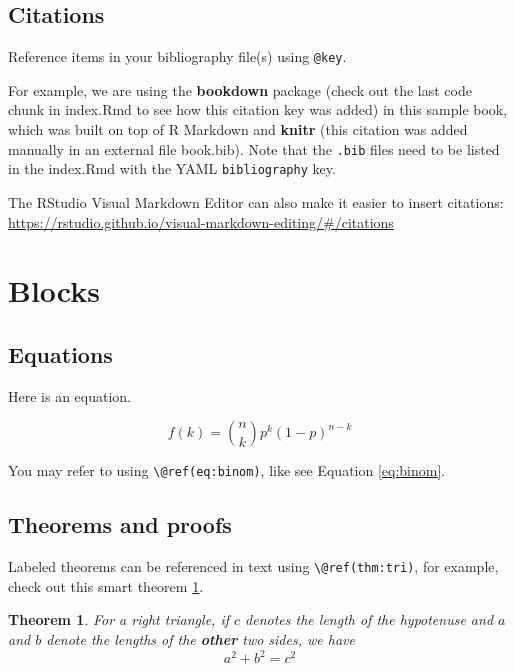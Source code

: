\documentclass[
]{book}
\newtheorem{theorem}{Theorem}[chapter]
\theoremstyle{definition}
\theoremstyle{definition}
\theoremstyle{definition}
\theoremstyle{definition}
\theoremstyle{remark}
\begin{document}
\subsection{Citations}\label{citations}

Reference items in your bibliography file(s) using \texttt{@key}.

For example, we are using the \textbf{bookdown} package \citep{R-bookdown} (check out the last code chunk in index.Rmd to see how this citation key was added) in this sample book, which was built on top of R Markdown and \textbf{knitr} \citep{xie2015} (this citation was added manually in an external file book.bib).
Note that the \texttt{.bib} files need to be listed in the index.Rmd with the YAML \texttt{bibliography} key.

The RStudio Visual Markdown Editor can also make it easier to insert citations: \url{https://rstudio.github.io/visual-markdown-editing/\#/citations}

\section{Blocks}\label{blocks}

\subsection{Equations}\label{equations}

Here is an equation.

\begin{equation} 
  f\left(k\right) = \binom{n}{k} p^k\left(1-p\right)^{n-k}
  \label{eq:binom}
\end{equation}

You may refer to using \texttt{\textbackslash{}@ref(eq:binom)}, like see Equation \eqref{eq:binom}.

\subsection{Theorems and proofs}\label{theorems-and-proofs}

Labeled theorems can be referenced in text using \texttt{\textbackslash{}@ref(thm:tri)}, for example, check out this smart theorem \ref{thm:tri}.

\begin{theorem}
\protect\hypertarget{thm:tri}{}\label{thm:tri}For a right triangle, if \(c\) denotes the \emph{length} of the hypotenuse
and \(a\) and \(b\) denote the lengths of the \textbf{other} two sides, we have
\[a^2 + b^2 = c^2\]
\end{theorem}
\end{document}
